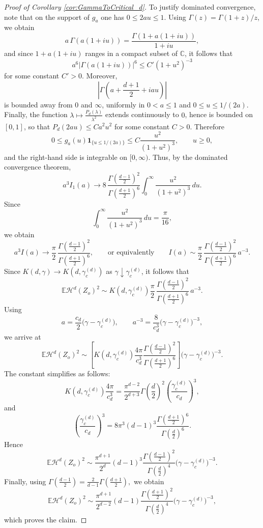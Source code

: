 \documentclass[10pt,a4paper]{amsart}
\def\CC{\mathbb{C}}
\def\EE{\mathbb{E}}
\def\cH{\mathcal{H}}
\begin{document}
\begin{proof}[Proof of Corollary \ref{cor:GammaToCritical_d}]
	To justify dominated convergence, note that on the support of \(g_a\) one has
	\(0\le 2au\le1\). Using \(\Gamma(z)=\Gamma(1+z)/z\), we obtain
	\[
	a\,\Gamma(a(1+iu))
	=
	\frac{\Gamma(1+a(1+iu))}{1+iu},
	\]
	and since \(1+a(1+iu)\) ranges in a compact subset of \(\CC\), it follows that
	\[
	a^6|\Gamma(a(1+iu))|^6\le C'(1+u^2)^{-3}
	\]
    for some constant $C'>0$.
	Moreover,
	\[
	\left|\Gamma\!\left(a+\frac{d+1}{2}+iau\right)\right|
	\]
	is bounded away from \(0\) and \(\infty\), uniformly in \(0<a\le1\) and
	\(0\le u\le 1/(2a)\). Finally, the function
	$
	\lambda\mapsto \frac{P_d(\lambda)}{\lambda^2}
	$
	extends continuously to \(0\), hence is bounded on \([0,1]\), so that
	$
	P_d(2au)\le C a^2u^2
	$ for some constant $C>0$.
	Therefore
	\[
	0\le g_a(u)\mathbf 1_{\{u\le1/(2a)\}}
	\le C\frac{u^2}{(1+u^2)^3},
	\qquad u\ge0,
	\]
	and the right-hand side is integrable on \([0,\infty)\). Thus, by the dominated convergence theorem,
	\[
	a^3 I_1(a)
	\longrightarrow
	8\,\frac{\Gamma\!\left(\frac{d-1}{2}\right)^2}{
		\Gamma\!\left(\frac{d+1}{2}\right)^6}
	\int_0^\infty \frac{u^2}{(1+u^2)^3}\,du.
	\]
	Since
	\[
	\int_0^\infty \frac{u^2}{(1+u^2)^3}\,du=\frac{\pi}{16},
	\]
	we obtain
	\[
	a^3 I(a)\longrightarrow
	\frac{\pi}{2}\,
	\frac{\Gamma\!\left(\frac{d-1}{2}\right)^2}{
		\Gamma\!\left(\frac{d+1}{2}\right)^6},\qquad\text{or equivalently}\qquad I(a)\sim
	\frac{\pi}{2}\,
	\frac{\Gamma\!\left(\frac{d-1}{2}\right)^2}{
		\Gamma\!\left(\frac{d+1}{2}\right)^6}\,
	a^{-3}.
	\]
	Since \(K(d,\gamma)\to K(d,\gamma_c^{(d)})\) as \(\gamma\downarrow\gamma_c^{(d)}\), it follows that
	\[
	\EE\cH^d(Z_o)^2
	\sim
	K(d,\gamma_c^{(d)})
	\frac{\pi}{2}\,
	\frac{\Gamma\!\left(\frac{d-1}{2}\right)^2}{
		\Gamma\!\left(\frac{d+1}{2}\right)^6}\,
	a^{-3}.
	\]
	Using
	\[
	a=\frac{c_d}{2}\bigl(\gamma-\gamma_c^{(d)}\bigr),
	\qquad
	a^{-3}=\frac{8}{c_d^3}\bigl(\gamma-\gamma_c^{(d)}\bigr)^{-3},
	\]
	we arrive at
	\[
	\EE\cH^d(Z_o)^2
	\sim
	\left[
	K(d,\gamma_c^{(d)})
	\frac{4\pi}{c_d^3}
	\frac{\Gamma\!\left(\frac{d-1}{2}\right)^2}{
		\Gamma\!\left(\frac{d+1}{2}\right)^6}
	\right]
	\bigl(\gamma-\gamma_c^{(d)}\bigr)^{-3}.
	\]
	The constant simplifies as follows:
	\[
	K(d,\gamma_c^{(d)}) \frac{4\pi}{c_d^3}
	=
	\frac{\pi^{d-2}}{2^{d+3}} \Gamma\!\left(\frac d2\right)^2
	\left(\frac{\gamma_c^{(d)}}{c_d}\right)^3,
	\]
	and
	\[
	\left(\frac{\gamma_c^{(d)}}{c_d}\right)^3
	=
	8\pi^3(d-1)^3
	\frac{\Gamma\!\left(\frac{d+1}{2}\right)^6}{
		\Gamma\!\left(\frac d2\right)^6}.
	\]
	Hence
	\[
	\EE\cH^d(Z_o)^2
	\sim
	\frac{\pi^{d+1}}{2^d}(d-1)^3
	\frac{\Gamma\!\left(\frac{d-1}{2}\right)^2}{
		\Gamma\!\left(\frac d2\right)^4}
	\bigl(\gamma-\gamma_c^{(d)}\bigr)^{-3}.
	\]
	Finally, using
	$
	\Gamma\!\left(\frac{d-1}{2}\right)
	=
	\frac{2}{d-1}\Gamma\!\left(\frac{d+1}{2}\right),
	$
	we obtain
	\[
	\EE\cH^d(Z_o)^2
	\sim
	\frac{\pi^{d+1}}{2^{d-2}}(d-1)
	\frac{\Gamma\!\left(\frac{d+1}{2}\right)^2}{
		\Gamma\!\left(\frac d2\right)^4}
	\bigl(\gamma-\gamma_c^{(d)}\bigr)^{-3},
	\]
	which proves the claim.
\end{proof}
\end{document}

